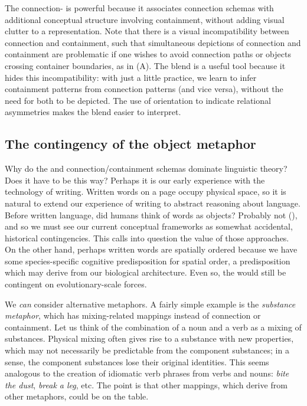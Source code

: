   The connection- is powerful because it associates connection schemas with additional conceptual structure involving containment, without adding visual clutter to a representation. Note that there is a visual incompatibility between connection and containment, such that simultaneous depictions of connection and containment are problematic if one wishes to avoid connection paths or objects crossing container boundaries, as in (A). The blend is a useful tool because it hides this incompatibility: with just a little practice, we learn to infer containment patterns from connection patterns (and vice versa), without the need for both to be depicted. The use of orientation to indicate relational asymmetries makes the blend easier to interpret.

\subsection{The contingency of the object metaphor}

Why do the  and connection/containment schemas dominate linguistic theory? Does it have to be this way? Perhaps it is our early experience with the technology of writing. Written words on a page occupy physical space, so it is natural to extend our experience of writing to abstract reasoning about language. Before written language, did humans think of words as objects? Probably not (\citealt{Linell1988,Linell2005,Ong2013}), and so we must see our current conceptual frameworks as somewhat accidental, historical contingencies. This calls into question the value of those approaches. On the other hand, perhaps written words are spatially ordered because we have some species-specific cognitive predisposition for spatial order, a predisposition which may derive from our biological architecture. Even so, the  would still be contingent on evolutionary-scale forces. 

  We \textit{can} consider alternative metaphors. A fairly simple example is the \textit{substance metaphor}, which has mixing-related mappings instead of connection or containment. Let us think of the combination of a noun and a verb as a mixing of substances. Physical mixing often gives rise to a substance with new properties, which may not necessarily be predictable from the component substances; in a sense, the component substances lose their original identities. This seems analogous to the creation of idiomatic verb phrases from verbs and nouns: \textit{bite the dust}, \textit{break a leg}, etc. The point is that other mappings, which derive from other metaphors, could be on the table.

